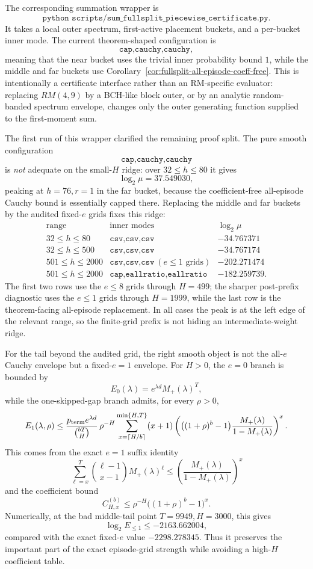 The corresponding summation wrapper is
\[
\texttt{python scripts/sum\_fullsplit\_piecewise\_certificate.py}.
\]
It takes a local outer spectrum, first-active placement buckets, and a per-bucket inner mode.  The current theorem-shaped
configuration is
\[
\texttt{cap,cauchy,cauchy},
\]
meaning that the near bucket uses the trivial inner probability bound \(1\), while the middle and far buckets use
Corollary~\ref{cor:fullsplit-all-episode-coeff-free}.  This is intentionally a certificate interface rather than an
RM-specific evaluator: replacing \(RM(4,9)\) by a BCH-like block outer, or by an analytic random-banded spectrum
envelope, changes only the outer generating function supplied to the first-moment sum.

The first run of this wrapper clarified the remaining proof split.  The pure smooth configuration
\[
\texttt{cap,cauchy,cauchy}
\]
is \emph{not} adequate on the small-\(H\) ridge: over \(32\le h\le80\) it gives
\[
\log_2\mu=37.549030,
\]
peaking at \(h=76,r=1\) in the far bucket, because the coefficient-free all-episode Cauchy bound is essentially capped
there.  Replacing the middle and far buckets by the audited fixed-\(e\) grids fixes this ridge:
\[
\begin{array}{c|c|c}
\text{range} & \text{inner modes} & \log_2\mu\\
\hline
32\le h\le80 & \texttt{csv,csv,csv} & -34.767371\\
32\le h\le500 & \texttt{csv,csv,csv} & -34.767174\\
501\le h\le2000 & \texttt{csv,csv,csv}\ (e\le1\text{ grids}) & -202.271474\\
501\le h\le2000 & \texttt{cap,eallratio,eallratio} & -182.259739 .
\end{array}
\]
The first two rows use the \(e\le8\) grids through \(H=499\); the sharper post-prefix diagnostic uses the \(e\le1\)
grids through \(H=1999\), while the last row is the theorem-facing all-episode replacement.  In all cases the peak is
at the left edge of the relevant range, so the finite-grid prefix is not hiding an intermediate-weight ridge.

For the tail beyond the audited grid, the right smooth object is not the all-\(e\) Cauchy envelope but a fixed-\(e=1\)
envelope.  For \(H>0\), the \(e=0\) branch is bounded by
\[
E_0(\lambda)=e^{\lambda d}M_+(\lambda)^T,
\]
while the one-skipped-gap branch admits, for every \(\rho>0\),
\begin{equation}
\label{eq:fullsplit-e1-cauchy-envelope}
E_1(\lambda,\rho)
\le
\frac{p_{\rm term}e^{\lambda d}}{\binom{bT}{H}}\,
\rho^{-H}
\sum_{x=\lceil H/b\rceil}^{\min\{H,T\}}
(x+1)
\left(
\big((1+\rho)^b-1\big)\frac{M_+(\lambda)}{1-M_+(\lambda)}
\right)^x .
\end{equation}
This comes from the exact \(e=1\) suffix identity
\[
\sum_{\ell=x}^{T}\binom{\ell-1}{x-1}M_+(\lambda)^\ell
\le
\left(\frac{M_+(\lambda)}{1-M_+(\lambda)}\right)^x
\]
and the coefficient bound
\[
C_{H,x}^{(b)}\le \rho^{-H}\big((1+\rho)^b-1\big)^x.
\]
Numerically, at the bad middle-tail point \(T=9949,H=3000\), this gives
\[
\log_2 E_{\le1}\le -2163.662004,
\]
compared with the exact fixed-\(e\) value \(-2298.278345\).  Thus it preserves the important part of the exact
episode-grid strength while avoiding a high-\(H\) coefficient table.

